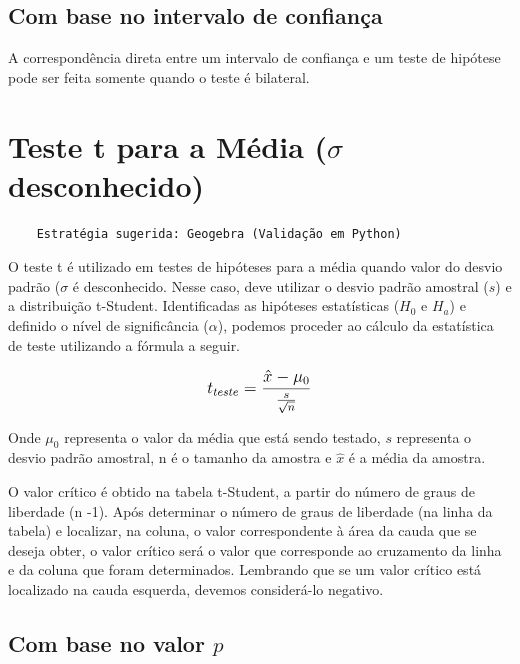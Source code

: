 \subsection{Com base no intervalo de confiança}

A correspondência direta entre um intervalo de confiança e um teste de hipótese pode ser feita somente quando o teste é bilateral.

\section{Teste t para a Média (\(\sigma\) desconhecido)}

\begin{verbatim}
	Estratégia sugerida: Geogebra (Validação em Python)
\end{verbatim}

O teste t é utilizado em testes de hipóteses para a média quando valor do desvio padrão (\(\sigma\) é desconhecido. Nesse caso, deve utilizar o desvio padrão amostral (\(s\)) e a distribuição t-Student. Identificadas as hipóteses estatísticas (\(H_0\) e \(H_a\)) e definido o nível de significância (\(\alpha\)), podemos proceder ao cálculo da estatística de teste utilizando a fórmula a seguir.

\[\beq{ t_{teste} = \frac{\hat{x}-\mu_0}{\frac{s}{\sqrt{n}}} } \]

Onde \(\mu_0\) representa o valor da média que está sendo testado, \(s\) representa o desvio padrão amostral, n é o tamanho da amostra e \(\hat{x}\) é a média da amostra.

O valor crítico é obtido na tabela t-Student, a partir do número de graus de liberdade (n -1). Após determinar o número de graus de liberdade (na linha da tabela) e localizar, na coluna, o valor correspondente à área da cauda que se deseja obter, o valor crítico será o valor que corresponde ao cruzamento da linha e da coluna que foram determinados. Lembrando que se um valor crítico está localizado na cauda esquerda, devemos considerá-lo negativo.

\subsection{Com base no valor \(p\)}

